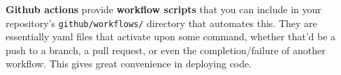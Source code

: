 \documentclass{article}
\begin{document}
  \textbf{Github actions} provide \textbf{workflow scripts} that you can include in your repository's \texttt{github/workflows/} directory that automates this. They are essentially yaml files that activate upon some command, whether that'd be a push to a branch, a pull request, or even the completion/failure of another workflow. This gives great convenience in deploying code. 

  

\section{}
\end{document}
